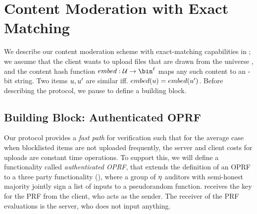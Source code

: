 \section{Content Moderation with Exact Matching}
\label{sec:exact_match}

%


We describe our content moderation scheme with exact-matching capabilities in ; we assume that the client wants to upload files that are drawn from the universe \universe, and the content hash function $\contentHash: \universe \rightarrow \bin^{\genericVecLen}$ maps any such content to an \genericVecLen-bit string. Two items $u, u'$ are similar iff. $\contentHash(\genericUniverseElmt) = \contentHash(\genericUniverseElmtAlt)$.  
Before describing the protocol, we pause to define a building block. 

\subsection{Building Block: Authenticated OPRF}
%

Our protocol provides a \emph{fast path} for verification such that for the average case when blocklisted items are not uploaded frequently, the server and client costs for uploads are constant time operations. To support this, we will define a functionality called \emph{authenticated OPRF}, that extends the definition of an OPRF to a three party functionality \authOPRFFunc (), where a group of $\eta$ auditors with semi-honest majority jointly sign a list of inputs to a pseudorandom function. \authOPRFFunc receives the key for the PRF from the client, who acts as the sender. The receiver of the PRF evaluations is the server, who does not input anything.



 


